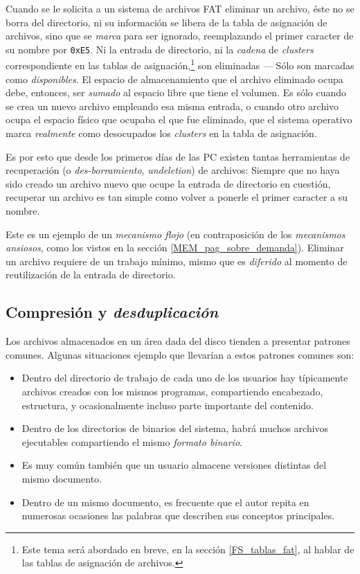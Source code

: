 \documentclass[11pt,fleqn]{book} %
\begin{document}
Cuando se le solicita a un sistema de archivos FAT eliminar un
archivo, éste no se borra del directorio, ni su información se libera
de la tabla de asignación de archivos, sino que se \emph{marca} para ser
ignorado, reemplazando el primer caracter de su nombre por \texttt{0xE5}. Ni
la entrada de directorio, ni la \emph{cadena} de \emph{clusters} correspondiente
en las tablas de asignación,\footnote{Este tema será abordado en breve, en
la sección \ref{FS_tablas_fat}, al hablar de las tablas de asignación
de archivos. } son eliminadas — Sólo son marcadas como
\emph{disponibles}. El espacio de almacenamiento que el archivo eliminado
ocupa debe, entonces, ser \emph{sumado} al espacio libre que tiene el
volumen. Es sólo cuando se crea un nuevo archivo empleando esa misma
entrada, o cuando otro archivo ocupa el espacio físico que ocupaba el
que fue eliminado, que el sistema operativo marca \emph{realmente} como
desocupados los \emph{clusters} en la tabla de asignación.

Es por esto que desde los primeros días de las PC existen tantas
herramientas de recuperación (o \emph{des-borramiento}, \emph{undeletion}) de
archivos: Siempre que no haya sido creado un archivo nuevo que ocupe
la entrada de directorio en cuestión, recuperar un archivo es tan
simple como volver a ponerle el primer caracter a su nombre.

Este es un ejemplo de un \emph{mecanismo flojo} (en contraposición de los
\emph{mecanismos ansiosos}, como los vistos en la sección
\ref{MEM_pag_sobre_demanda}). Eliminar un archivo requiere de un
trabajo mínimo, mismo que es \emph{diferido} al momento de reutilización de
la entrada de directorio.
\subsection{Compresión y \emph{desduplicación}}
\label{sec-7-1-5}
\label{FS_compr_dedup}


Los archivos almacenados en un área dada del disco tienden a presentar
patrones comunes. Algunas situaciones ejemplo que llevarían a estos
patrones comunes son:

\begin{itemize}
\item Dentro del directorio de trabajo de cada uno de los usuarios hay
  típicamente archivos creados con los mismos programas, compartiendo
  encabezado, estructura, y ocasionalmente incluso parte importante
  del contenido.
\item Dentro de los directorios de binarios del sistema,
  habrá muchos archivos ejecutables compartiendo el mismo \emph{formato   binario}.
\item Es muy común también que un usuario almacene versiones distintas del
  mismo documento.
\item Dentro de un mismo documento, es frecuente que el autor repita en
  numerosas ocasiones las palabras que describen sus conceptos
  principales.
\end{itemize}
\end{document}
